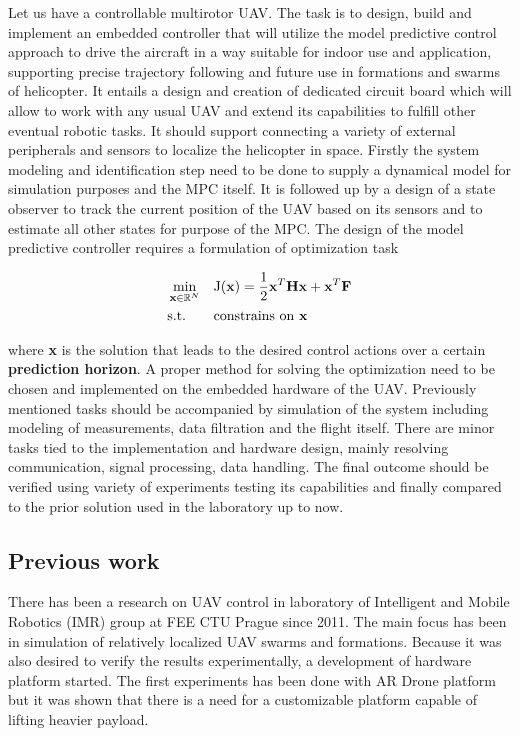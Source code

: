 Let us have a controllable multirotor UAV. The task is to design, build and implement an embedded controller that will utilize the model predictive control approach to drive the aircraft in a way suitable for indoor use and application, supporting precise trajectory following and future use in formations and swarms of helicopter. It entails a design and creation of dedicated circuit board which will allow to work with any usual UAV and extend its capabilities to fulfill other eventual robotic tasks. It should support connecting a variety of external peripherals and sensors to localize the helicopter in space. Firstly the system modeling and identification step need to be done to supply a dynamical model for simulation purposes and the MPC itself. It is followed up by a design of a state observer to track the current position of the UAV based on its sensors and to estimate all other states for purpose of the MPC. The design of the model predictive controller requires a formulation of optimization task

\begin{equation}
\label{eq:qmpc_intro}
\begin{aligned}
& \min_{\textbf{x} \in \mathbb{R}^{N}}
& & \mathrm{J}(\textbf{x}) = \frac{1}{2}\textbf{x}^T\textbf{H}\textbf{x} + \textbf{x}^T\textbf{F}\\
& \text{s.t.}
& & \text{constrains on \textbf{x}}
\end{aligned}
\end{equation}

where \textbf{x} is the solution that leads to the desired control actions over a certain \textbf{prediction horizon}. A proper method for solving the optimization need to be chosen and implemented on the embedded hardware of the UAV. Previously mentioned tasks should be accompanied by simulation of the system including modeling of measurements, data filtration and the flight itself. There are minor tasks tied to the implementation and hardware design, mainly resolving communication, signal processing, data handling. The final outcome should be verified using variety of experiments testing its capabilities and finally compared to the prior solution used in the laboratory up to now.

\subsection{Previous work}
\label{cap:prior_work}

There has been a research on UAV control in laboratory of Intelligent and Mobile Robotics (IMR) group at FEE CTU Prague since 2011. The main focus has been in simulation of relatively localized UAV swarms and formations. Because it was also desired to verify the results experimentally, a development of hardware platform started. The first experiments has been done with AR Drone platform \citep{kranik2012drone} but it was shown that there is a need for a customizable platform capable of lifting heavier payload.

